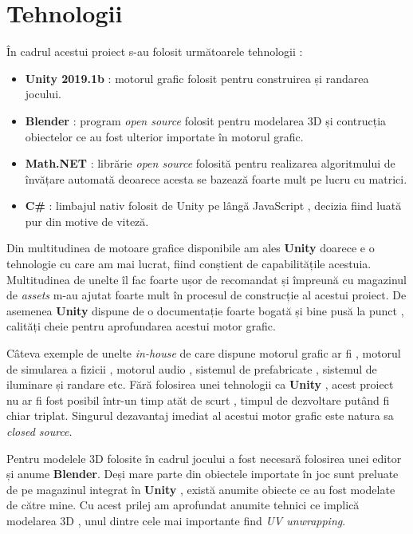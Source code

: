 \chapter{Tehnologii}

În cadrul acestui proiect s-au folosit următoarele tehnologii :
\begin{itemize}
\item \textbf{Unity 2019.1b} : motorul grafic folosit pentru construirea și randarea jocului.
\item \textbf{Blender} : program \textit{open source} folosit pentru modelarea 3D și contrucția obiectelor ce au fost ulterior importate în motorul grafic.
\item \textbf{Math.NET} : librărie \textit{open source} folosită pentru realizarea algoritmului de învățare automată deoarece acesta se bazează foarte mult pe lucru cu matrici.
\item \textbf{C\#} : limbajul nativ folosit de Unity pe lângă JavaScript , decizia fiind luată pur din motive de viteză.
\end{itemize}

Din multitudinea de motoare grafice disponibile am ales \textbf{Unity} doarece e o tehnologie cu care am mai lucrat, fiind conștient de capabilitățile acestuia. Multitudinea de unelte îl fac foarte ușor de recomandat și împreună cu magazinul de \textit{assets} m-au ajutat foarte mult în procesul de construcție al acestui proiect. De asemenea \textbf{Unity} dispune de o documentație foarte bogată și bine pusă la punct , calități cheie pentru aprofundarea acestui motor grafic.\par

Câteva exemple de unelte \textit{in-house} de care dispune motorul grafic ar fi , motorul de simularea a fizicii , motorul audio , sistemul de prefabricate , sistemul de iluminare și randare etc. Fără folosirea unei tehnologii ca \textbf{Unity} , acest proiect nu ar fi fost posibil într-un timp atăt de scurt , timpul de dezvoltare putând fi chiar triplat. Singurul dezavantaj imediat al acestui motor grafic este natura sa \textit{closed source}.\par

Pentru modelele 3D folosite în cadrul jocului a fost necesară folosirea unei editor și anume \textbf{Blender}. Deși mare parte din obiectele importate în joc sunt preluate de pe magazinul integrat în \textbf{Unity} , există anumite obiecte ce au fost modelate de către mine. Cu acest prilej am aprofundat anumite tehnici ce implică modelarea 3D , unul dintre cele mai importante find \textit {UV unwrapping}.\par

